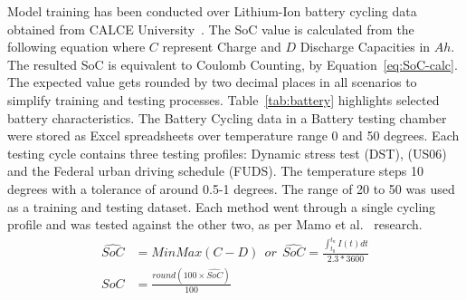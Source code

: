 Model training has been conducted over Lithium-Ion battery cycling data obtained from CALCE University~\cite{noauthor_calce_2017}.
The SoC value is calculated from the following equation where $C$ represent Charge and $D$ Discharge Capacities in $Ah$.
The resulted SoC is equivalent to Coulomb Counting, by Equation~\ref{eq:SoC-calc}.
The expected value gets rounded by two decimal places in all scenarios to simplify training and testing processes. 
Table~\ref{tab:battery} highlights selected battery characteristics.
The Battery Cycling data in a Battery testing chamber were stored as Excel spreadsheets over temperature range 0 and 50 degrees.
Each testing cycle contains three testing profiles: Dynamic stress test (DST), (US06) and the Federal urban driving schedule (FUDS).
The temperature steps 10 degrees with a tolerance of around 0.5-1 degrees.
The range of 20 to 50 was used as a training and testing dataset.
Each method went through a single cycling profile and was tested against the other two, as per Mamo et al.~\cite{mamo_long_2020} research.
\begin{equation}
    \begin{split}
        \hat{SoC} &= MinMax(C-D)\ \ or\ \ \hat{SoC} = \frac{\int_{t_0}^{t_n} I(t)dt} {2.3*3600} \\
        SoC &= \frac{round(100\times\hat{SoC})}{100}
        \label{eq:SoC-calc}
    \end{split}
\end{equation}
\begin{table}[ht]
    \renewcommand{\arraystretch}{1.3}
    \caption{Battery characteristics}
    \centering
    \label{tab:battery}
\end{table}
